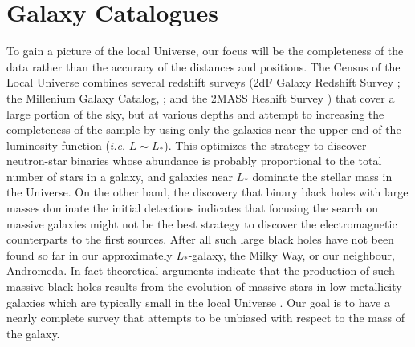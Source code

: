\documentclass[useAMS,usenatbib]{mn2e}
\begin{document}
\section{Galaxy Catalogues}

To gain a picture of the local Universe, our focus will be the
completeness of the data rather than the accuracy of the distances and
positions.  The Census of the Local Universe
\citep[CLU;][]{2015arXiv150803608G} combines several redshift surveys
(2dF Galaxy Redshift Survey \cite{2002MNRAS.336..907N}; the Millenium
Galaxy Catalog, \cite{2003MNRAS.344..307L,2005MNRAS.360...81D}; and
the 2MASS Reshift Survey \cite{2012ApJS..199...26H}) that cover a
large portion of the sky, but at various depths and attempt to
increasing the completeness of the sample by using only the galaxies
near the upper-end of the luminosity function ({\em i.e.}  $L\sim
L_*$).  This optimizes the strategy to discover neutron-star binaries
whose abundance is probably proportional to the total number of stars
in a galaxy, and galaxies near $L_*$ dominate the stellar mass in the
Universe.  On the other hand, the discovery that binary black holes
with large masses dominate the initial detections indicates that
focusing the search on massive galaxies might not be the best strategy
to discover the electromagnetic counterparts to the first sources.
After all such large black holes have not been found so far in our
approximately $L_*$-galaxy, the Milky Way, or our neighbour,
Andromeda.  In fact theoretical arguments indicate that the production
of such massive black holes results from the evolution of massive
stars in low metallicity galaxies
\citep{2016ApJ...818L..22A,2016arXiv160203790E} which are typically
small in the local Universe \citep[e.g.][]{1997MNRAS.285..613H}. Our
goal is to have a nearly complete survey that attempts to be unbiased
with respect to the mass of the galaxy.
\end{document}
